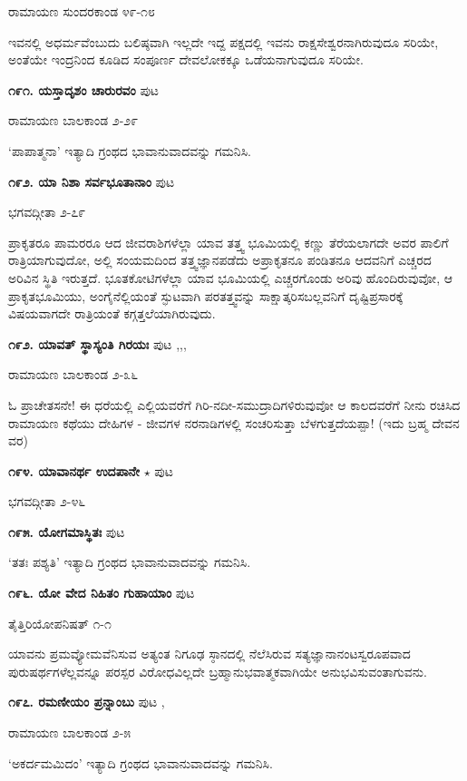 {\hfill ರಾಮಾಯಣ ಸುಂದರಕಾಂಡ ೪೯-೧೮

ಇವನಲ್ಲಿ ಅಧರ್ಮವೆಂಬುದು ಬಲಿಷ್ಠವಾಗಿ ಇಲ್ಲದೇ ಇದ್ದ ಪಕ್ಷದಲ್ಲಿ ಇವನು ರಾಕ್ಷಸೇಶ್ವರನಾಗಿರುವುದೂ ಸರಿಯೇ, ಅಂತೆಯೇ ಇಂದ್ರನಿಂದ ಕೂಡಿದ ಸಂಪೂರ್ಣ ದೇವಲೋಕಕ್ಕೂ ಒಡೆಯನಾಗುವುದೂ ಸರಿಯೇ.

\medskip
\noindent\textbf{೧೯೧. ಯಸ್ತಾದೃಶಂ ಚಾರುರವಂ} \hfill ಪುಟ \pageref{250}

\hfill ರಾಮಾಯಣ ಬಾಲಕಾಂಡ ೨-೨೯

`ಪಾಪಾತ್ಮನಾ' ಇತ್ಯಾದಿ ಗ್ರಂಥದ ಭಾವಾನುವಾದವನ್ನು ಗಮನಿಸಿ.

\medskip
\noindent\textbf{೧೯೨. ಯಾ ನಿಶಾ ಸರ್ವಭೂತಾನಾಂ} \hfill ಪುಟ \pageref{138}

\hfill ಭಗವದ್ಗೀತಾ ೨-೭೯

ಪ್ರಾಕೃತರೂ ಪಾಮರರೂ ಆದ ಜೀವರಾಶಿಗಳೆಲ್ಲಾ ಯಾವ ತತ್ತ್ವ ಭೂಮಿಯಲ್ಲಿ ಕಣ್ಣು ತೆರೆಯಲಾಗದೇ ಅವರ ಪಾಲಿಗೆ ರಾತ್ರಿಯಾಗುವುದೋ, ಅಲ್ಲಿ ಸಂಯಮದಿಂದ ತತ್ತ್ವಜ್ಞಾನಪಡೆದು ಅಪ್ರಾಕೃತನೂ ಪಂಡಿತನೂ ಆದವನಿಗೆ ಎಚ್ಚರದ ಅರಿವಿನ ಸ್ಥಿತಿ ಇರುತ್ತದೆ. ಭೂತಕೋಟಿಗಳೆಲ್ಲಾ ಯಾವ ಭೂಮಿಯಲ್ಲಿ ಎಚ್ಚರಗೊಂಡು ಅರಿವು ಹೊಂದಿರುವುವೋ, ಆ ಪ್ರಾಕೃತಭೂಮಿಯು, ಅಂಗೈನೆಲ್ಲಿಯಂತೆ ಸ್ಫುಟವಾಗಿ ಪರತತ್ತ್ವವನ್ನು ಸಾಕ್ಷಾತ್ಕರಿಸಬಲ್ಲವನಿಗೆ ದೃಷ್ಟಿಪ್ರಸಾರಕ್ಕೆ ವಿಷಯವಾಗದೇ ರಾತ್ರಿಯಂತೆ ಕಗ್ಗತ್ತಲೆಯಾಗಿರುವುದು.

\medskip
\noindent\textbf{೧೯೨. ಯಾವತ್ ಸ್ಥಾಸ್ಯಂತಿ ಗಿರಯಃ} \hfill ಪುಟ \pageref{158b},\pageref{166},\pageref{208b},\pageref{210b}

\hfill ರಾಮಾಯಣ ಬಾಲಕಾಂಡ ೨-೩೬

ಓ ಪ್ರಾಚೇತಸನೇ! ಈ ಧರೆಯಲ್ಲಿ ಎಲ್ಲಿಯವರೆಗೆ ಗಿರಿ-ನದೀ-ಸಮುದ್ರಾದಿಗಳಿರುವುವೋ ಆ ಕಾಲದವರೆಗೆ ನೀನು ರಚಿಸಿದ ರಾಮಾಯಣ ಕಥೆಯು ದೇಹಿಗಳ - ಜೀವಗಳ ನರನಾಡಿಗಳಲ್ಲಿ ಸಂಚರಿಸುತ್ತಾ ಬೆಳಗುತ್ತದೆಯಪ್ಪಾ! (ಇದು ಬ್ರಹ್ಮ ದೇವನ ವರ)

\medskip
\noindent\textbf{೧೯೪. ಯಾವಾನರ್ಥ ಉದಪಾನೇ} $\star$ \hfill ಪುಟ \pageref{14}

\hfill ಭಗವದ್ಗೀತಾ ೨-೪೬

\medskip
\noindent\textbf{೧೯೫. ಯೋಗಮಾಸ್ಥಿತಃ} \hfill ಪುಟ \pageref{249b}

\hfill `ತತಃ ಪಶ್ಯತಿ' ಇತ್ಯಾದಿ ಗ್ರಂಥದ ಭಾವಾನುವಾದವನ್ನು ಗಮನಿಸಿ.

\medskip
\noindent\textbf{೧೯೬. ಯೋ ವೇದ ನಿಹಿತಂ ಗುಹಾಯಾಂ} \hfill ಪುಟ \pageref{108}

\hfill ತೈತ್ತಿರಿಯೋಪನಿಷತ್ ೧-೧

ಯಾವನು ಪ್ರಮವ್ಯೋಮವೆನಿಸುವ ಅತ್ಯಂತ ನಿಗೂಢ ಸ್ಠಾನದಲ್ಲಿ ನೆಲೆಸಿರುವ ಸತ್ಯಜ್ಞಾನಾನಂಟಸ್ವರೂಪವಾದ ಪುರುಷರ್ಥಗಳೆಲ್ಲವನ್ನೂ ಪರಸ್ಪರ ವಿರೋಧವಿಲ್ಲದೇ ಬ್ರಹ್ಮಾನುಭವಾತ್ಮಕವಾಗಿಯೇ ಅನುಭವಿಸುವಂತಾಗುವನು.

\medskip
\noindent\textbf{೧೯೭. ರಮಣೀಯಂ ಪ್ರನ್ನಾಂಬು} \hfill ಪುಟ \pageref{165c},\pageref{211f}

\hfill ರಾಮಾಯಣ ಬಾಲಕಾಂಡ ೨-೫

`ಅಕರ್ದಮಮಿದಂ' ಇತ್ಯಾದಿ ಗ್ರಂಥದ ಭಾವಾನುವಾದವನ್ನು ಗಮನಿಸಿ.

}
